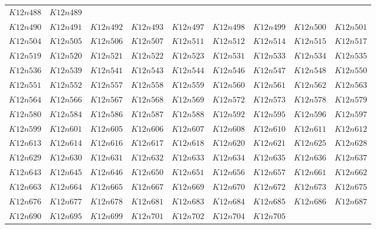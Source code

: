 \documentclass{amsart} %
\theoremstyle{thm}
\theoremstyle{definition}
\numberwithin{equation}{section}
\begin{document}
{\begin{longtable}{@{}lllllllll@{}}
  $K12n488$ &  
  $K12n489$ \\   
  $K12n490$ &  
  $K12n491$ &  
  $K12n492$ &  
  $K12n493$ &  
  $K12n497$ &  
  $K12n498$ &  
  $K12n499$ &  
  $K12n500$ &  
  $K12n501$ \\   
  $K12n504$ &  
  $K12n505$ &  
  $K12n506$ &  
  $K12n507$ &  
  $K12n511$ &  
  $K12n512$ &  
  $K12n514$ &  
  $K12n515$ &  
  $K12n517$ \\   
  $K12n519$ &  
  $K12n520$ &  
  $K12n521$ &  
  $K12n522$ &  
  $K12n523$ &  
  $K12n531$ &  
  $K12n533$ &  
  $K12n534$ &  
  $K12n535$ \\   
  $K12n536$ &  
  $K12n539$ &  
  $K12n541$ &  
  $K12n543$ &  
  $K12n544$ &  
  $K12n546$ &  
  $K12n547$ &  
  $K12n548$ &  
  $K12n550$ \\   
  $K12n551$ &  
  $K12n552$ &  
  $K12n557$ &  
  $K12n558$ &  
  $K12n559$ &  
  $K12n560$ &  
  $K12n561$ &  
  $K12n562$ &  
  $K12n563$ \\   
  $K12n564$ &  
  $K12n566$ &  
  $K12n567$ &  
  $K12n568$ &  
  $K12n569$ &  
  $K12n572$ &  
  $K12n573$ &  
  $K12n578$ &  
  $K12n579$ \\   
  $K12n580$ &  
  $K12n584$ &  
  $K12n586$ &  
  $K12n587$ &  
  $K12n588$ &  
  $K12n592$ &  
  $K12n595$ &  
  $K12n596$ &  
  $K12n597$ \\   
  $K12n599$ &  
  $K12n601$ &  
  $K12n605$ &  
  $K12n606$ &  
  $K12n607$ &  
  $K12n608$ &  
  $K12n610$ &  
  $K12n611$ &  
  $K12n612$ \\   
  $K12n613$ &  
  $K12n614$ &  
  $K12n616$ &  
  $K12n617$ &  
  $K12n618$ &  
  $K12n620$ &  
  $K12n621$ &  
  $K12n625$ &  
  $K12n628$ \\   
  $K12n629$ &  
  $K12n630$ &  
  $K12n631$ &  
  $K12n632$ &  
  $K12n633$ &  
  $K12n634$ &  
  $K12n635$ &  
  $K12n636$ &  
  $K12n637$ \\   
  $K12n643$ &  
  $K12n645$ &  
  $K12n646$ &  
  $K12n650$ &  
  $K12n651$ &  
  $K12n656$ &  
  $K12n657$ &  
  $K12n661$ &  
  $K12n662$ \\   
  $K12n663$ &  
  $K12n664$ &  
  $K12n665$ &  
  $K12n667$ &  
  $K12n669$ &  
  $K12n670$ &  
  $K12n672$ &  
  $K12n673$ &  
  $K12n675$ \\   
  $K12n676$ &  
  $K12n677$ &  
  $K12n678$ &  
  $K12n681$ &  
  $K12n683$ &  
  $K12n684$ &  
  $K12n685$ &  
  $K12n686$ &  
  $K12n687$ \\   
  $K12n690$ &  
  $K12n695$ &  
  $K12n699$ &  
  $K12n701$ &  
  $K12n702$ &  
  $K12n704$ &  
  $K12n705$ &  

\end{longtable}}
\end{document}

